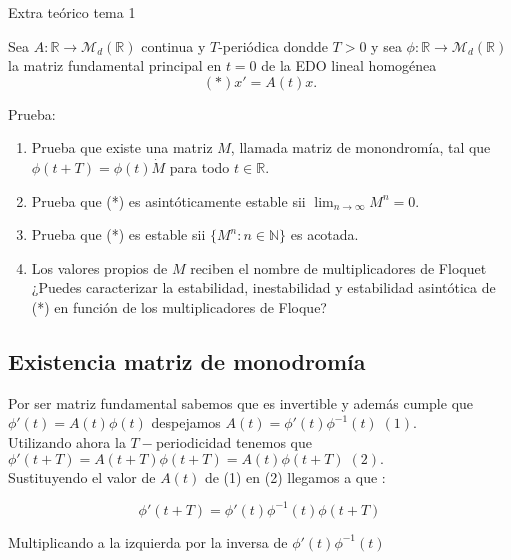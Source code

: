 \documentclass[a4paper , 14pt, spanish ]{article}
\begin{document}
\begin{Proof}{Extra teórico tema 1}{}

  Sea $A: \mathbb R \longrightarrow \mathcal {M}_d (\mathbb R )$ continua y $T$-periódica dondde $T>0$
  y sea $\phi: \mathbb R \longrightarrow  \mathcal {M}_d (\mathbb R )$ la matriz fundamental principal en $t=0$
  de la EDO lineal homogénea
  $$(*) x' = A(t) x. $$


  Prueba:

  \begin{enumerate}
  \item Prueba que existe una matriz $M$, llamada matriz de monondromía, tal que $\phi(t+T) = \phi(t) \dot M$ para todo $t \in \mathbb R.$

  \item Prueba que (*) es asintóticamente estable sii $ \lim_{ n \longrightarrow \infty} M^n = 0.$

  \item Prueba que (*) es estable sii $\{ M^n : n \in \mathbb N\}$ es acotada.

  \item Los valores propios de $M$ reciben el nombre de multiplicadores de Floquet ¿Puedes caracterizar la estabilidad, inestabilidad y estabilidad asintótica
    de (*) en función de los multiplicadores de Floque?
    

    
    \end{enumerate}
 
\end{Proof}


\subsection{Existencia matriz de monodromía }


Por ser matriz fundamental sabemos que es invertible y además  cumple que $\phi'(t) = A(t) \phi(t)$
despejamos  $A(t) = \phi'(t)  \phi^{-1}(t)  \; (1).$\\

Utilizando ahora la $T-$periodicidad   tenemos que $\phi'(t+T) = A(t+T) \phi(t+T) =  A(t) \phi(t+T) \; (2).$ \\

Sustituyendo el valor de $A(t)$ de (1) en (2) llegamos a que :

$$\phi'(t+T) =  \phi'(t)  \phi^{-1}(t)  \phi(t+T)$$

Multiplicando a la izquierda por la inversa de $\phi'(t)  \phi^{-1}(t)$
\end{document}
